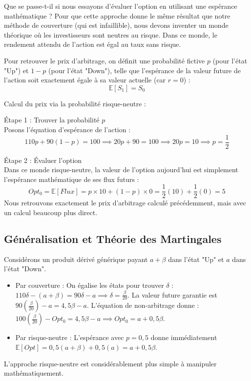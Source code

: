 Que se passe-t-il si nous essayons d'évaluer l'option en utilisant une espérance mathématique ? Pour que cette approche donne le même résultat que notre méthode de couverture (qui est infaillible), nous devons inventer un monde théorique où les investisseurs sont neutres au risque. Dans ce monde, le rendement attendu de l'action est égal au taux sans risque.

Pour retrouver le prix d'arbitrage, on définit une probabilité fictive $p$ (pour l'état "Up") et $1-p$ (pour l'état "Down"), telle que l'espérance de la valeur future de l'action soit exactement égale à sa valeur actuelle (car $r=0$) :
\begin{equation}
    \label{eq:fsec3-esperance_s0}
    \mathbb{E}[S_1] = S_0
\end{equation}

Calcul du prix via la probabilité risque-neutre :

Étape 1 : Trouver la probabilité $p$\\
Posons l'équation d'espérance de l'action :
\begin{equation}
    \label{eq:fsec3-proba_rn_calc}
    110p + 90(1-p) = 100 \implies 20p + 90 = 100 \implies 20p = 10 \implies p = \frac{1}{2}
\end{equation}

Étape 2 : Évaluer l'option\\
Dans ce monde risque-neutre, la valeur de l'option aujourd'hui est simplement l'espérance mathématique de ses flux futurs :
\begin{equation}
    \label{eq:fsec3-esperance_opt}
    Opt_0 = \mathbb{E}[Flux] = p \times 10 + (1-p) \times 0 = \frac{1}{2}(10) + \frac{1}{2}(0) = 5
\end{equation}
Nous retrouvons exactement le prix d'arbitrage calculé précédemment, mais avec un calcul beaucoup plus direct.

\subsection{Généralisation et Théorie des Martingales}

Considérons un produit dérivé générique payant $a + \beta$ dans l'état "Up" et $a$ dans l'état "Down".
\begin{itemize}[label=$\rightarrow$]
    \item Par couverture : On égalise les états pour trouver $\delta$ : $110\delta - (a + \beta) = 90\delta - a \implies \delta = \frac{\beta}{20}$. La valeur future garantie est $90(\frac{\beta}{20}) - a = 4,5\beta - a$. L'équation de non-arbitrage donne : $100(\frac{\beta}{20}) - Opt_0 = 4,5\beta - a \implies Opt_0 = a + 0,5\beta$.
    \item Par risque-neutre : L'espérance avec $p=0,5$ donne immédiatement $\mathbb{E}[Opt] = 0,5(a + \beta) + 0,5(a) = a + 0,5\beta$.
\end{itemize}
L'approche risque-neutre est considérablement plus simple à manipuler mathématiquement.

